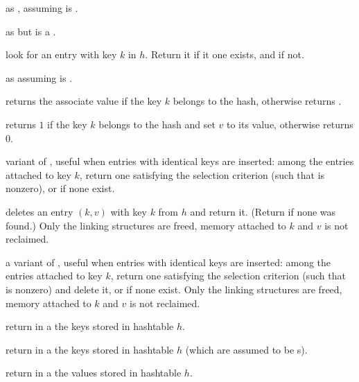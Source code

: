 as , assuming  is .

 as
 but  is a .

 look for an entry
with key $k$ in $h$. Return it if it one exists, and  if not.

 as
 assuming  is .

returns the associate value if the key $k$ belongs to the hash,
otherwise returns .

returns $1$ if the key $k$ belongs to the hash and set $v$ to its value,
otherwise returns 0.

 variant of , useful when entries
with identical keys are inserted: among the entries attached to
key $k$, return one satisfying the selection criterion (such that
 is nonzero), or  if none exist.

 deletes an entry $(k,v)$
with key $k$ from $h$ and return it. (Return  if none was found.)
Only the linking structures are freed, memory attached to $k$ and $v$
is not reclaimed.

a variant of , useful when entries with identical keys are
inserted: among the entries attached to key $k$, return one satisfying the
selection criterion (such that  is nonzero) and delete it,
or  if none exist. Only the linking structures are freed, memory
attached to $k$ and $v$ is not reclaimed.

 return in a  the keys
stored in hashtable $h$.

 return in a  the keys
stored in hashtable $h$ (which are assumed to be s).

 return in a 
the values stored in hashtable $h$.

